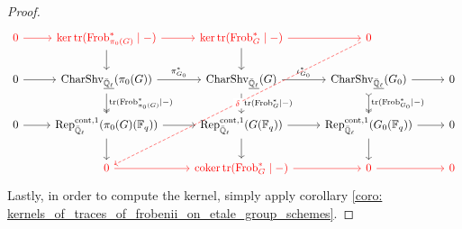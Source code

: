 \begin{proof}
                        $$
                            \begin{tikzcd}
                            	{\textcolor{red}{0}} & {\textcolor{red}{\ker \trace(\Frob_{\pi_0(G)}^* \mid -)}} & {\textcolor{red}{\ker \trace(\Frob_G^* \mid -)}} & {\textcolor{red}{0}} \\
                            	0 & {\Char\Shv_{\underline{\bar{\Q}_{\ell}}}(\pi_0(G))} & {\Char\Shv_{\underline{\bar{\Q}_{\ell}}}(G)} & {\Char\Shv_{\underline{\bar{\Q}_{\ell}}}(G_0)} & 0 \\
                            	0 & {\Rep^{\cont, 1}_{\bar{\Q}_{\ell}}(\pi_0(G)(\F_q))} & {\Rep^{\cont, 1}_{\bar{\Q}_{\ell}}(G(\F_q))} & {\Rep^{\cont, 1}_{\bar{\Q}_{\ell}}(G_0(\F_q))} & 0 \\
                            	& {\textcolor{red}{0}} & {\textcolor{red}{\coker \trace(\Frob_G^* \mid -)}} & {\textcolor{red}{0}} & {\textcolor{red}{0}}
                            	\arrow[from=2-1, to=2-2]
                            	\arrow["{\pi_{G_0}^*}", from=2-2, to=2-3]
                            	\arrow["{\iota_{G_0}^*}", from=2-3, to=2-4]
                            	\arrow[from=2-4, to=2-5]
                            	\arrow[from=3-1, to=3-2]
                            	\arrow[from=3-2, to=3-3]
                            	\arrow[from=3-3, to=3-4]
                            	\arrow[from=3-4, to=3-5]
                            	\arrow["{\trace(\Frob_{\pi_0(G)}^* \mid -)}", two heads, from=2-2, to=3-2]
                            	\arrow["{\trace(\Frob_G^* \mid -)}", from=2-3, to=3-3]
                            	\arrow["{\trace(\Frob_{G_0}^* \mid -)}", tail, two heads, from=2-4, to=3-4]
                            	\arrow[from=1-2, to=2-2]
                            	\arrow[from=1-3, to=2-3]
                            	\arrow[color={red}, from=1-1, to=1-2]
                            	\arrow[color={red}, from=1-2, to=1-3]
                            	\arrow[color={red}, from=1-3, to=1-4]
                            	\arrow[from=3-3, to=4-3]
                            	\arrow[from=3-2, to=4-2]
                            	\arrow[from=3-4, to=4-4]
                            	\arrow["\delta"{description}, color={red}, dashed, from=1-4, to=4-2]
                            	\arrow[color={red}, from=4-2, to=4-3]
                            	\arrow[color={red}, from=4-3, to=4-4]
                            	\arrow[color={red}, from=4-4, to=4-5]
                            \end{tikzcd}
                        $$
                    Lastly, in order to compute the kernel, simply apply corollary \ref{coro: kernels_of_traces_of_frobenii_on_etale_group_schemes}.
                \end{proof}
        
